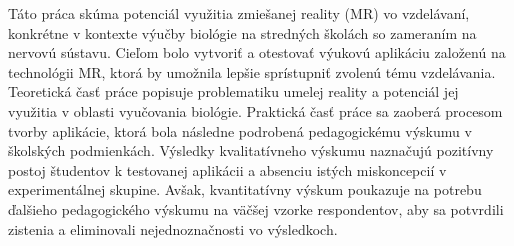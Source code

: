 Táto práca skúma potenciál využitia zmiešanej reality (MR) vo vzdelávaní, konkrétne v kontexte výučby biológie na stredných školách so zameraním na nervovú sústavu. 
Cieľom bolo vytvoriť a otestovať výukovú aplikáciu založenú na technológii MR, ktorá by umožnila lepšie sprístupniť zvolenú tému vzdelávania.
Teoretická časť práce popisuje problematiku umelej reality a potenciál jej využitia v oblasti vyučovania biológie.
Praktická časť práce sa zaoberá procesom tvorby aplikácie, ktorá bola následne podrobená pedagogickému výskumu v školských podmienkách.
Výsledky kvalitatívneho výskumu naznačujú pozitívny postoj študentov k testovanej aplikácii a absenciu istých miskoncepcií v experimentálnej skupine. 
Avšak, kvantitatívny výskum poukazuje na potrebu ďalšieho pedagogického výskumu na väčšej vzorke respondentov, aby sa potvrdili zistenia a eliminovali nejednoznačnosti vo výsledkoch.
